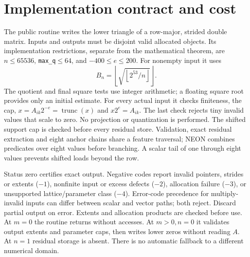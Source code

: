 \documentclass[10pt,a4paper]{article}
\begin{document}
\section{Implementation contract and cost}
The public routine writes the lower triangle of a row-major, strided double
matrix. Inputs and outputs must be disjoint valid allocated objects. Its
implementation restrictions, separate from the mathematical theorem, are
$n\le65536$, \textnormal{\texttt{max\_q}}$\le64$, and $-400\le e\le200$.
For nonempty input it uses
\[
 B_n=\left\lfloor\sqrt{\left\lfloor2^{53}/n\right\rfloor}\right\rfloor.
\]
The quotient and final square tests use integer arithmetic; a floating square
root provides only an initial estimate. For every actual input it checks
finiteness, the cap, $x=A_{ik}2^{-e}=\operatorname{trunc}(x)$ and
$x2^e=A_{ik}$. The last check rejects tiny invalid values that scale to zero.
No projection or quantization is performed. The shifted support cap is checked
before every residual store. Validation, exact residual extraction and eight
anchor chains share a feature traversal; NEON combines predicates over eight
values before branching. A scalar tail of one through eight values prevents
shifted loads beyond the row.

Status zero certifies exact output. Negative codes report invalid pointers,
strides or extents ($-1$), nonfinite input or excess defects ($-2$), allocation
failure ($-3$), or unsupported lattice/parameter class ($-4$). Error-code
precedence for multiply-invalid inputs can differ between scalar and vector
paths; both reject. Discard partial output on error. Extents and allocation
products are checked before use. At $m=0$ the routine returns without accesses.
At $m>0,n=0$ it validates output extents and parameter caps, then writes lower
zeros without reading $A$. At $n=1$ residual storage is absent. There is no
automatic fallback to a different numerical domain.
\end{document}
